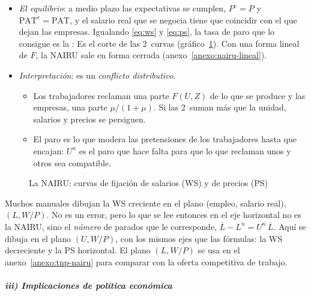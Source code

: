 \documentclass[11pt]{article}
\begin{document}
\begin{itemize}
\item \emph{El equilibrio}: a medio plazo las expectativas se cumplen, $P^e=P$ y $\mathrm{PAT}^e=\mathrm{PAT}$, y el salario real que se negocia tiene que coincidir con el que dejan las empresas. Igualando \eqref{eq:ws} y \eqref{eq:ps}, la tasa de paro que lo consigue es la :
  Es el corte de las 2~curvas (gráfico~\ref{fig:ws-ps}). Con una forma lineal de $F$, la NAIRU sale en forma cerrada (anexo~\ref{anexo:nairu-lineal}).
\item \emph{Interpretación}: es un \emph{conflicto distributivo}.
  \begin{itemize}
  \item Los trabajadores reclaman una parte $F(U,Z)$ de lo que se produce y las empresas, una parte $\mu/(1+\mu)$. Si las 2~suman más que la unidad, salarios y precios se persiguen.
  \item El paro es lo que modera las pretensiones de los trabajadores hasta que encajan: $U^n$ es el paro que hace falta para que lo que reclaman unos y otros sea compatible.
  \end{itemize}
\end{itemize}

\begin{figure}[H]
\centering
\caption{La NAIRU: curvas de fijación de salarios (WS) y de precios (PS)}\label{fig:ws-ps}
\end{figure}

\begin{notaopositor}
Muchos manuales dibujan la WS creciente en el plano (empleo, salario real), $(L,W/P)$. No es un error, pero lo que se lee entonces en el eje horizontal no es la NAIRU, sino el \emph{número} de parados que le corresponde, $\overline L-L^n=U^n\,\overline L$. Aquí se dibuja en el plano $(U,W/P)$, con los mismos ejes que las fórmulas: la WS decreciente y la PS horizontal. El plano $(L,W/P)$ se usa en el anexo~\ref{anexo:tnp-nairu} para comparar con la oferta competitiva de trabajo.
\end{notaopositor}

\subparagraph{iii) Implicaciones de política económica}
\end{document}
